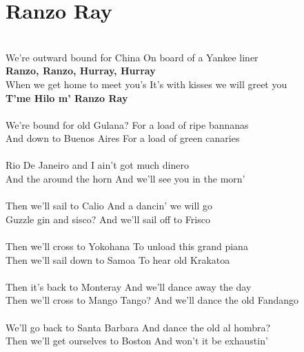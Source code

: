 \documentclass[letterpaper,9pt]{article}
\begin{document}
\newpage
\section{Ranzo Ray}
\LARGE
\noindent
\\We’re outward bound for China On board of a Yankee liner
\\\textbf{Ranzo, Ranzo, Hurray, Hurray}
\\When we get home to meet you’s It’s with kisses we will greet you
\\\textbf{T’me Hilo m’ Ranzo Ray}
\\
\\We’re bound for old Gulana? For a load of ripe bannanas
\\And down to Buenos Aires For a load of green canaries
\\
\\Rio De Janeiro and I ain’t got much dinero
\\And the around the horn And we’ll see you in the morn’
\\
\\Then we’ll sail to Calio And a dancin’ we will go
\\Guzzle gin and sisco? And we’ll sail off to Frisco
\\
\\Then we’ll cross to Yokohana To unload this grand piana
\\Then we’ll sail down to Samoa To hear old Krakatoa
\\
\\Then it’s back to Monteray And we’ll dance away the day
\\Then we’ll cross to Mango Tango? And we’ll dance the old Fandango
\\
\\We’ll go back to Santa Barbara And dance the old al hombra?
\\Then we’ll get ourselves to Boston And won’t it be exhaustin’

\newpage
\end{document}
